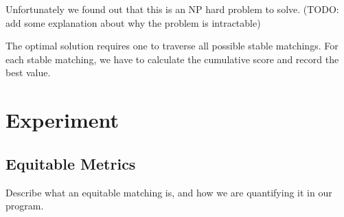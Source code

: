 \documentclass[a4paper]{article}
\begin{document}
Unfortunately we found out that this is an NP hard problem to solve. (TODO: add some explanation about why the problem is intractable)

The optimal solution requires one to traverse all possible stable matchings. For each stable matching, we have to calculate the cumulative score and record the best value.

\section{Experiment}
\subsection{Equitable Metrics}
Describe what an equitable matching is, and how we are quantifying it in our program.
\end{document}
